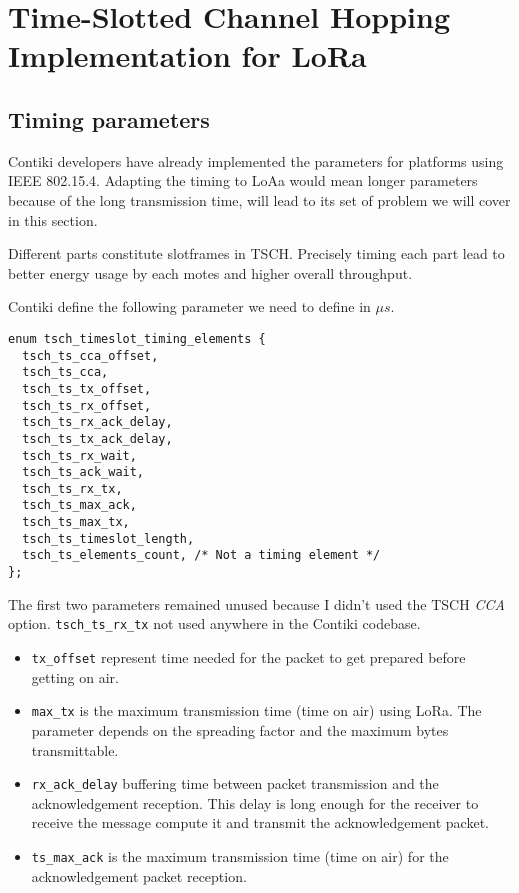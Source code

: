 \chapter{Time-Slotted Channel Hopping Implementation for LoRa\label{section:tsch}}

\section{Timing parameters}

Contiki developers have already implemented the parameters for
platforms using IEEE 802.15.4.
Adapting the timing to LoAa would mean longer parameters because of the long
transmission time, will lead to its set of problem we will cover in this
section.

Different parts constitute slotframes in TSCH. Precisely timing each part lead
to better energy usage by each motes and higher overall throughput.

Contiki define the following parameter we need to define in $\mu s$.

\begin{lstlisting}
enum tsch_timeslot_timing_elements {
  tsch_ts_cca_offset,
  tsch_ts_cca,
  tsch_ts_tx_offset,
  tsch_ts_rx_offset,
  tsch_ts_rx_ack_delay,
  tsch_ts_tx_ack_delay,
  tsch_ts_rx_wait,
  tsch_ts_ack_wait,
  tsch_ts_rx_tx,
  tsch_ts_max_ack,
  tsch_ts_max_tx,
  tsch_ts_timeslot_length,
  tsch_ts_elements_count, /* Not a timing element */
};
\end{lstlisting}

The first two parameters remained unused because I didn't used the TSCH
\emph{CCA} option. 
\lstinline{tsch_ts_rx_tx} not used anywhere in the Contiki codebase.

\begin{itemize}
  \item \lstinline{tx_offset} represent time needed for the packet to get
    prepared before getting on air.
  \item \lstinline{max_tx} is the maximum transmission time (time on air) using
    LoRa. The parameter depends on the spreading factor and the maximum bytes
    transmittable.
  \item \lstinline{rx_ack_delay} buffering time between packet transmission and
    the acknowledgement reception. This delay is long enough for the receiver
    to receive the message compute it and transmit the acknowledgement packet.
  \item \lstinline{ts_max_ack} is the maximum transmission time (time on air) for
    the acknowledgement packet reception.
\end{itemize}

